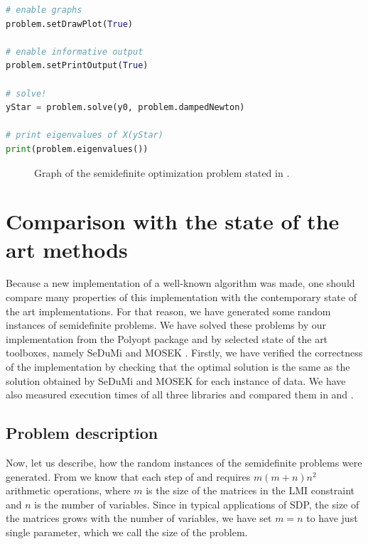 \begin{example}
\begin{lstlisting}[float, language=python, caption={Code for solving semidefinite problem stated in \refex{SDP:imp:demo}.}, labellis={SDP:imp:demo}]
# enable graphs
problem.setDrawPlot(True)

# enable informative output
problem.setPrintOutput(True)

# solve!
yStar = problem.solve(y0, problem.dampedNewton)

# print eigenvalues of X(yStar)
print(problem.eigenvalues())
  \end{lstlisting}

  \begin{figure}[ht]
    \centering
    \resizebox{0.95\textwidth}{!}{}
    \caption{Graph of the semidefinite optimization problem stated in .}
  \end{figure}
\end{example}

\section{Comparison with the state of the art methods}

Because a new implementation of a well-known algorithm was made, one should compare many properties of this implementation with the contemporary state of the art implementations.
For that reason, we have generated some random instances of semidefinite problems.
We have solved these problems by our implementation from the Polyopt package and by selected state of the art toolboxes, namely SeDuMi \cite{sedumi} and MOSEK \cite{mosek}.
Firstly, we have verified the correctness of the implementation by checking that the optimal solution is the same as the solution obtained by SeDuMi and MOSEK for each instance of data.
We have also measured execution times of all three libraries and compared them in  and .

\subsection{Problem description}
Now, let us describe, how the random instances of the semidefinite problems were generated.
From  we know that each step of  and  requires $m(m+n)n^2$ arithmetic operations, where $m$ is the size of the matrices in the LMI constraint and $n$ is the number of variables.
Since in typical applications of SDP, the size of the matrices grows with the number of variables, we have set $m = n$ to have just single parameter, which we call the size of the problem.

